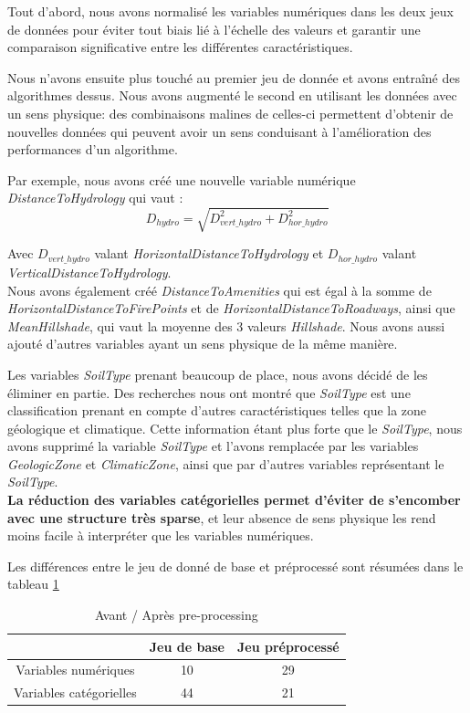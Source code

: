 \documentclass{article}
\begin{document}
Tout d'abord, nous avons normalisé les variables numériques dans les deux jeux de données pour éviter tout biais lié à l'échelle des valeurs et garantir une comparaison significative entre les différentes caractéristiques.

Nous n'avons ensuite plus touché au premier jeu de donnée et avons entraîné des algorithmes dessus. Nous avons augmenté le second en utilisant les données avec un sens physique: des combinaisons malines de celles-ci permettent d'obtenir de nouvelles données qui peuvent avoir un sens conduisant à l'amélioration des performances d'un algorithme.

Par exemple, nous avons créé une nouvelle variable numérique \textit{DistanceToHydrology} qui vaut :
\begin{equation}
    D_{hydro}=\sqrt{D_{vert\_hydro}^2 + D_{hor\_hydro}^2}
\end{equation}

Avec $D_{vert\_hydro}$ valant \textit{HorizontalDistanceToHydrology} et  $D_{hor\_hydro}$  valant \textit{VerticalDistanceToHydrology}.\\ Nous avons également créé \textit{DistanceToAmenities} qui est égal à la somme de \textit{HorizontalDistanceToFirePoints} et de \textit{HorizontalDistanceToRoadways}, ainsi que \textit{MeanHillshade}, qui vaut la moyenne des 3 valeurs \textit{Hillshade}. Nous avons aussi ajouté d'autres variables ayant un sens physique de la même manière.

Les variables \textit{SoilType} prenant beaucoup de place, nous avons décidé de les éliminer en partie. Des recherches nous ont montré que \textit{SoilType} est une classification prenant en compte d'autres caractéristiques telles que la zone géologique et climatique. Cette information étant plus forte que le \textit{SoilType}, nous avons supprimé la variable \textit{SoilType} et l'avons remplacée par les variables \textit{GeologicZone} et \textit{ClimaticZone}, ainsi que par d'autres variables représentant le \textit{SoilType}.\\
\textbf{La réduction des variables catégorielles permet d'éviter de s'encomber avec une structure très sparse}, et leur absence de sens physique les rend moins facile à interpréter que les variables numériques. 

Les différences entre le jeu de donné de base et préprocessé sont résumées dans le tableau \ref{tab:avant_après}

\begin{table}[h]
  \centering
  \begin{tabular}{|c|c|c|}
    \hline
     & Jeu de base & Jeu préprocessé \\
    \hline
    Variables numériques & 10 & 29 \\
    \hline
    Variables catégorielles & 44 & 21 \\
    \hline
  \end{tabular}
  \caption{Avant / Après pre-processing}
  \label{tab:avant_après}
\end{table}
\end{document}
